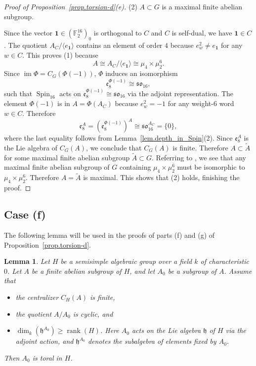 \documentclass[12pt]{amsart}
\numberwithin{equation}{section}
\newtheorem{lemma}[theorem]{Lemma}
\theoremstyle{remark}
\newcommand{\im}{\operatorname{im}}
\newcommand{\Spin}{\operatorname{Spin}}
\newcommand{\rank}{\operatorname{rank}}
\newcommand{\bF}{\mathbb{F}}
\begin{document}
\begin{proof}[Proof of Proposition~\ref{prop.torsion-d}(e)]
\smallskip (2) $A \subset G$ is a maximal finite abelian subgroup. 

\smallskip\noindent
Since the vector $\mathbf{1} \in (\bF_2^{16})_0$ is orthogonal to $C$ and $C$ is self-dual, we have $\mathbf{1}\in C$. The quotient $A_C/\langle e_{\mathbf{1}}\rangle$ contains an element of order $4$ because $e_w^2 \neq e_{\mathbf{1}}$ for any $w\in C$. This proves (1) because 
$$A \cong A_C/\langle e_{\mathbf{1}}\rangle \cong \mu_4\times\mu_2^6.$$
Since $\im\Phi=C_G(\Phi(-1))$, $\Phi$ induces an isomorphism
$$\mathfrak e_8^{\Phi(-1)} \cong \mathfrak{so}_{16},$$
such that $\Spin_{16}$ acts on $\mathfrak e_8^{\Phi(-1)} \cong \mathfrak{so}_{16}$ via the adjoint representation. The element $\Phi(-1)$ is in $A = \Phi(A_C)$ because $e_w^{2} = -1$ for any weight-$6$ word $w\in C$. Therefore 
$$\mathfrak e_8^{A} = (\mathfrak e_8^{\Phi(-1)} )^{A} \cong \mathfrak{so}_{16}^{A_C} = \{0\},$$
where the last equality follows from Lemma~\ref{lem.depth_in_Spin}(2). Since $\mathfrak e_8^{A}$ is the Lie algebra of $C_G(A)$, we conclude that $C_G(A)$ is finite. Therefore $A \subset \tilde{A}$ for some maximal finite abelian subgroup $\tilde{A} \subset G$. Referring to \cite[Theorem 1.1]{draper2017maximal}, we see that any maximal finite abelian subgroup of $G$ containing $\mu_4\times \mu_2^6$ must be isomorphic to $\mu_4\times \mu_2^6$. Therefore $A = \tilde{A}$ is maximal. This shows that (2) holds, finishing the proof.  
\end{proof}


\subsection{Case (f)} The following lemma will be used in the proofs of parts (f) and (g) of Proposition~\ref{prop.torsion-d}.

\begin{lemma} \label{lem.lie-algebra} Let $H$ be a semisimple
algebraic group over a field $k$ of characteristic $0$. Let  
$A$ be a finite abelian subgroup of $H$, and let $A_0$ be a subgroup of $A$. Assume that 

\begin{itemize}
\item
the centralizer $C_H(A)$ is finite,

\item the quotient $A/A_0$ is cyclic, and

\item $\dim_k(\mathfrak h^{A_0}) \geqslant \rank(H)$. Here $A_0$ acts on the Lie algebra $\mathfrak h$ of $H$ via the adjoint action,
and $\mathfrak h^{A_0}$ denotes the subalgebra of elements fixed by $A_0$. 
\end{itemize}

Then $A_0$ is toral in $H$. 
\end{lemma}
\end{document}
